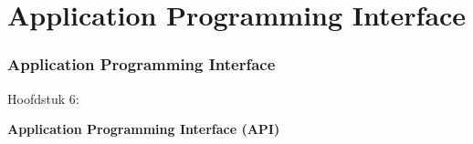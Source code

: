 %

\section{Application Programming Interface}
\begin{frame}[fragile]
	\frametitle{Application Programming Interface}

	\begin{center}\huge{Hoofdstuk 6:}\end{center}
	\begin{center}\huge{\color{typo3darkgrey}\textbf{Application Programming Interface (API)}}\end{center}

\end{frame}


